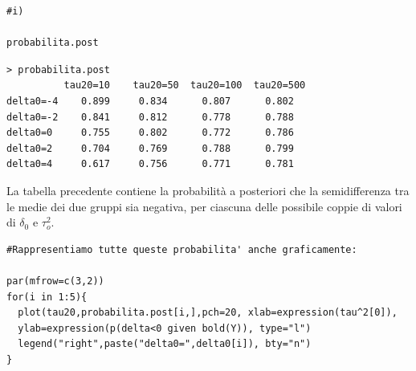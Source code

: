 \begin{itemize}[-]
\begin{lstlisting}[style=R]
#i)

probabilita.post
\end{lstlisting}

{
\color{red}
\begin{Verbatim}
> probabilita.post
          tau20=10    tau20=50  tau20=100  tau20=500
delta0=-4    0.899     0.834      0.807      0.802
delta0=-2    0.841     0.812      0.778      0.788
delta0=0     0.755     0.802      0.772      0.786
delta0=2     0.704     0.769      0.788      0.799
delta0=4     0.617     0.756      0.771      0.781
\end{Verbatim}
}
La tabella precedente contiene la probabilità a posteriori che la semidif\-ferenza tra le medie dei due gruppi sia negativa, 
per ciascuna delle possibile coppie di valori di $\delta_0$ e $\tau_o^2$.

\begin{lstlisting}[style=R]
#Rappresentiamo tutte queste probabilita' anche graficamente:

par(mfrow=c(3,2))
for(i in 1:5){
  plot(tau20,probabilita.post[i,],pch=20, xlab=expression(tau^2[0]),
  ylab=expression(p(delta<0 given bold(Y)), type="l")
  legend("right",paste("delta0=",delta0[i]), bty="n")
}

\end{lstlisting}


\end{itemize}
